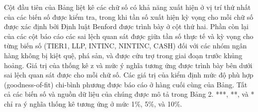 Cột đầu tiên của Bảng liệt kê các chữ số có khả năng xuất hiện ở vị trí thứ nhất của các biến số được kiểm tra, trong khi tần số xuất hiện kỳ vọng cho mỗi chữ số được xác định bởi Định luật Benford được trình bày ở cột thứ hai. Phần còn lại của các cột báo cáo các sai lệch quan sát được giữa tần số thực tế và kỳ vọng cho từng biến số (TIER1, LLP, INTINC, NINTINC, CASH) đối với các nhóm ngân hàng không bị kiệt quệ, phá sản, và được cứu trợ trong giai đoạn trước khủng hoảng. Giá trị của thống kê z và mức ý nghĩa tương ứng được trình bày bên dưới sai lệch quan sát được cho mỗi chữ số. Các giá trị của kiểm định mức độ phù hợp (goodness-of-fit) chi-bình phương được báo cáo ở hàng cuối cùng của Bảng. Tất cả các biến số và nguồn dữ liệu của chúng được mô tả trong Bảng 2. ***, **, và * chỉ ra ý nghĩa thống kê tương ứng ở mức 1\%, 5\%, và 10\%.

